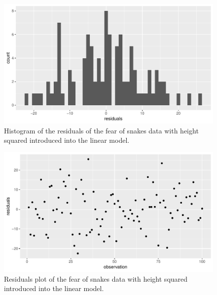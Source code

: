 \documentclass[]{report}\usepackage[]{graphicx}\usepackage[]{color}
\makeatletter
\def\maxwidth{ %
  \ifdim\Gin@nat@width>\linewidth
    \linewidth
  \else
    \Gin@nat@width
  \fi
}
\newenvironment{knitrout}{}{} %
\makeatother
\begin{document}
\begin{knitrout}
\color{fgcolor}\begin{figure}

{\centering \includegraphics[width=\maxwidth]{figure/ass_14-1} 

}

\caption[Histogram of the residuals of the fear of snakes data with height squared introduced into the linear model]{Histogram of the residuals of the fear of snakes data with height squared introduced into the linear model.}\label{fig:ass_14}
\end{figure}


\end{knitrout}

\begin{knitrout}
\color{fgcolor}\begin{figure}

{\centering \includegraphics[width=\maxwidth]{figure/ass_15-1} 

}

\caption[Residuals plot of the fear of snakes data with height squared introduced into the linear model]{Residuals plot of the fear of snakes data with height squared introduced into the linear model. }\label{fig:ass_15}
\end{figure}


\end{knitrout}
\end{document}

